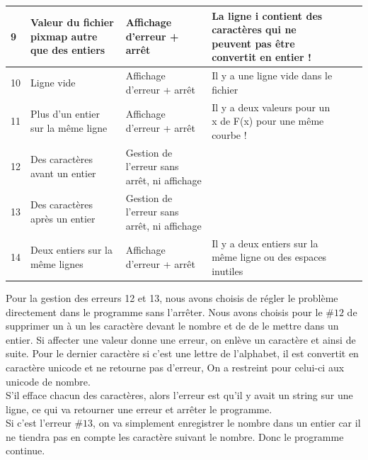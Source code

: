 \documentclass[11pt, a4paper, oneside]{article}   	%
\begin{document}
\begin{tabular}{ | l | p{4cm} | p{3cm} | p{4.5cm}  | l | l | }
	9 & Valeur du fichier pixmap autre que des entiers & Affichage d'erreur + arrêt & La ligne i contient des caractères qui ne peuvent pas être convertit en entier ! & \checkmark   \\ \hline
	10 & Ligne vide & Affichage d'erreur + arrêt & Il y a une ligne vide dans le fichier & \checkmark   \\ \hline
	11 & Plus d'un entier sur la même ligne  & Affichage d'erreur + arrêt & Il y a deux valeurs pour un x de F(x) pour une même courbe ! & \checkmark   \\ \hline
	12 & Des caractères avant un entier & Gestion de l'erreur sans arrêt, ni affichage &  & \checkmark   \\ \hline
	13 & Des caractères après un entier & Gestion de l'erreur sans arrêt, ni affichage &  & \checkmark   \\ \hline
	14 & Deux entiers sur la même lignes & Affichage d'erreur + arrêt & Il y a deux entiers sur la même ligne ou des espaces inutiles & \checkmark   \\ \hline
\end{tabular}

\vspace{+20pt}

Pour la gestion des erreurs 12 et 13, nous avons choisis de régler le problème directement dans le programme sans l'arrêter. Nous avons choisis pour le $\# 12$ de supprimer un à un les caractère devant le nombre et de de le mettre dans un entier. Si affecter une valeur donne une erreur, on enlève un caractère et ainsi de suite. Pour le dernier caractère si c'est une lettre de l'alphabet, il est convertit en caractère unicode et ne retourne pas d'erreur, On a restreint pour celui-ci aux unicode de nombre. \\

S'il efface chacun des caractères, alors l'erreur est qu'il y avait un string sur une ligne, ce qui va retourner une erreur et arrêter le programme.\\

Si c'est l'erreur $\#13$, on va simplement enregistrer le nombre dans un entier car il ne tiendra pas en compte les caractère suivant le nombre. Donc le programme continue. 



\end{document}
